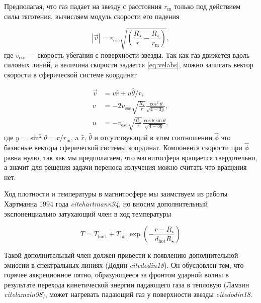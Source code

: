 \documentclass{article}
\begin{document}
Предполагая, что газ падает на звезду с расстояния $r_\text{m}$ только под действием силы тяготения, вычисляем модуль скорости его падения

\begin{equation} \label{eq:velabs}
|\vec{v}| = v_\text{esc}\sqrt{\left(\frac{R_\star}{r} - \frac{R_\star}{r_\text{m}}\right)},
\end{equation}
где $v_\text{esc}$ --- скорость убегания с поверхности звезды. Так как газ движется вдоль силовых линий, а величина скорости задается \eqref{eq:velabs}, можно записать вектор скорости в сферической системе координат

\begin{align} \label{eq:velvec}
 \vec{v} & = v \hat{r} + u \hat{\theta}/r, \\
 v & = -2v_\text{esc}\sqrt{\frac{R_\star}{r}}\frac{\cos^2\theta}{\sqrt{4-3y}}, \nonumber \\
 u & = -v_\text{esc}\sqrt{\frac{R_\star}{r}}\frac{\cos\theta\sin\theta}{\sqrt{4-3y}}, \nonumber
\end{align}
где $y = \sin^2\theta = r/r_\text{m}$, a $\hat{r}$, $\hat{\theta}$ и отсутствующий в этом соотношении $\hat{\phi}$ это базисные вектора сферической системы координат. Компонента скорости при $\hat{\phi}$ равна нулю, так как мы предполагаем, что магнитосфера вращается твердотельно, а значит для решения задачи переноса излучения можно считать что вращения нет.

Ход плотности и температуры в магнитосфере мы заимствуем из работы Хартманна 1994 года \textit{cite{hartmann94}}, но вносим дополнительный экспоненциально затухающий член в ход температуры

\begin{equation} \label{eq:temp}
 T = T_{\text{hart}} + T_\text{hot}\exp\left(-\frac{r - R_\star}{d_\text{hot} R_\star}\right)
\end{equation}

Такой дополнительный член должен привести к появлению дополнительной эмиссии в спектральных линиях (Додин \textit{cite{dodin18}}). Он обусловлен тем, что горячее аккреционное пятно, образующееся за фронтом ударной волны в результате перехода кинетической энергии падающего газа в тепловую (Ламзин \textit{cite{lamzin98}}),
 может нагревать падающий газ у поверхности звезды \textit{cite{dodin18}}.

\end{document}
